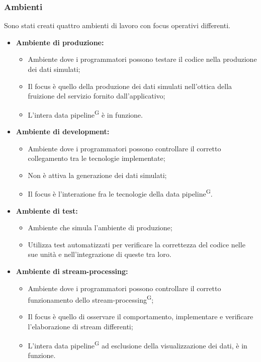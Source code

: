 \documentclass[8pt]{article}
\newcommand{\glossterm}[1]{#1\textsuperscript{G}} %
\begin{document}
\subsubsection{Ambienti}
Sono stati creati quattro ambienti di lavoro con focus operativi differenti.
\begin{itemize}
	\setlength\itemsep{0em}
    \item \textbf{Ambiente di produzione:}
    \begin{itemize}
	\setlength\itemsep{0em}
        \item Ambiente dove i programmatori possono testare il codice nella produzione dei dati simulati;
        \item Il focus è quello della produzione dei dati simulati nell'ottica della fruizione del servizio fornito dall'applicativo;
        \item L'intera \glossterm{data pipeline} è in funzione.
    \end{itemize}
    \item \textbf{Ambiente di development:}
    \begin{itemize}
	\setlength\itemsep{0em}
        \item Ambiente dove i programmatori possono controllare il corretto collegamento tra le tecnologie implementate;
        \item Non è attiva la generazione dei dati simulati;
        \item Il focus è l'interazione fra le tecnologie della \glossterm{data pipeline}.
    \end{itemize}
    \item \textbf{Ambiente di test:}
    \begin{itemize}
	\setlength\itemsep{0em}
        \item Ambiente che simula l'ambiente di produzione;
        \item Utilizza test automatizzati per verificare la correttezza del codice nelle sue unità e nell'integrazione di queste tra loro.
    \end{itemize}
     \item \textbf{Ambiente di stream-processing:}
    \begin{itemize}
	\setlength\itemsep{0em}
        \item Ambiente dove i programmatori possono controllare il corretto funzionamento dello \glossterm{stream-processing};
        \item Il focus è quello di osservare il comportamento, implementare e verificare l'elaborazione di stream differenti;
        \item L'intera \glossterm{data pipeline} ad esclusione della visualizzazione dei dati, è in funzione.
    \end{itemize}
\end{itemize}
\end{document}
